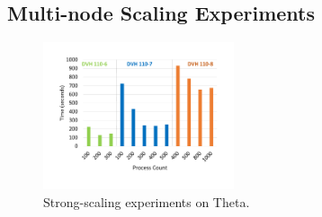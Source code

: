 \subsection{Multi-node Scaling Experiments}
\label{sec:eval:theta}
\label{sec:eval:pb3}
%


\begin{figure}
\begin{center}
\vspace{-.05in}
\includegraphics[width=0.5\textwidth, trim={2cm 2cm 2cm
    2cm},clip]{fig/dvh.pdf}
\end{center}
\vspace{-.15in}
\caption{Strong-scaling experiments on Theta.}
\label{fig:theta}
\vspace{-.2in}
\end{figure}

